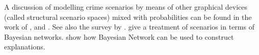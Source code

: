 \documentclass{article}
\begin{document}
%

A discussion
of modelling crime scenarios by means of other graphical devices (called structural scenario spaces) mixed with probabilities can be found in the work of 
\cite{shen2007ScenariodrivenDecisionSupporta}, \cite{bex2011ArgumentsStoriesCriminal, bex2015IntegratedTheoryCausal} and
\cite{verheijproof2017}.
See also the survey by \citet{di2018evidential}.
\cite{dawid2018graphical} 
give a treatment of scenarios in terms of  Bayesian networks. \cite{lacave2002ReviewExplanationMethodsa} show how Bayesian Network can be used to construct explanations.















%
\end{document}
